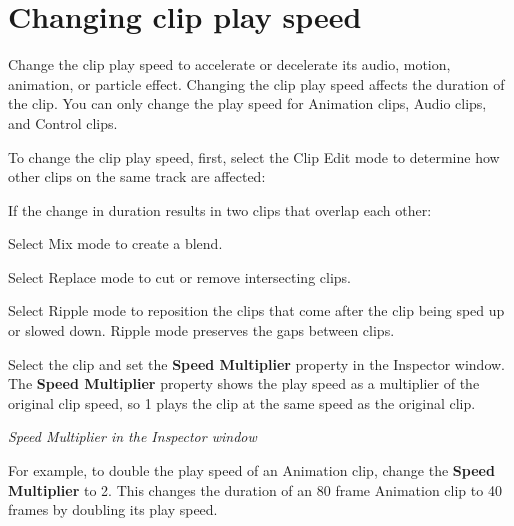 \chapter{Changing clip play speed}
\hypertarget{md__hey_tea_9_2_library_2_package_cache_2com_8unity_8timeline_0d1_87_85_2_documentation_0i_2clp__speed}{}\label{md__hey_tea_9_2_library_2_package_cache_2com_8unity_8timeline_0d1_87_85_2_documentation_0i_2clp__speed}
\label{md__hey_tea_9_2_library_2_package_cache_2com_8unity_8timeline_0d1_87_85_2_documentation_0i_2clp__speed_autotoc_md4626}%
%
 Change the clip play speed to accelerate or decelerate its audio, motion, animation, or particle effect. Changing the clip play speed affects the duration of the clip. You can only change the play speed for Animation clips, Audio clips, and Control clips.

To change the clip play speed, first, select the Clip Edit mode to determine how other clips on the same track are affected\+:


\begin{DoxyItemize}
\item If the change in duration results in two clips that overlap each other\+:
\begin{DoxyItemize}
\item Select Mix mode to create a blend.
\item Select Replace mode to cut or remove intersecting clips.
\end{DoxyItemize}
\item Select Ripple mode to reposition the clips that come after the clip being sped up or slowed down. Ripple mode preserves the gaps between clips.
\end{DoxyItemize}

Select the clip and set the {\bfseries{Speed Multiplier}} property in the Inspector window. The {\bfseries{Speed Multiplier}} property shows the play speed as a multiplier of the original clip speed, so 1 plays the clip at the same speed as the original clip.



{\itshape Speed Multiplier in the Inspector window}

For example, to double the play speed of an Animation clip, change the {\bfseries{Speed Multiplier}} to 2. This changes the duration of an 80 frame Animation clip to 40 frames by doubling its play speed.

